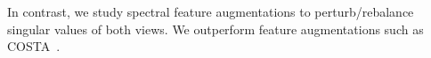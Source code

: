 In contrast, we study spectral feature augmentations to perturb/rebalance singular values of both views. We outperform  feature augmentations such as COSTA~\cite{zhang2022costa}.

